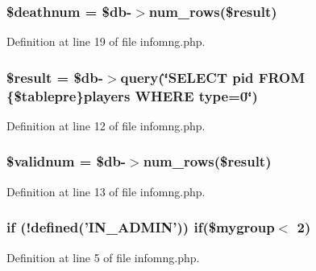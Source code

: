 \hypertarget{infomng_8php_ac8cccc0e21ebd6828150700b1436a5f8}{
\subsubsection[{\$deathnum}]{\setlength{\rightskip}{0pt plus 5cm}\$deathnum = \$db-\/$>$num\+\_\+rows(\${\bf result})}}\label{infomng_8php_ac8cccc0e21ebd6828150700b1436a5f8}


Definition at line 19 of file infomng.\+php.

\hypertarget{infomng_8php_a112ef069ddc0454086e3d1e6d8d55d07}{
\subsubsection[{\$result}]{\setlength{\rightskip}{0pt plus 5cm}\${\bf result} = \$db-\/$>$query(\char`\"{}S\+E\+L\+E\+C\+T pid F\+R\+O\+M \{\$tablepre\}players W\+H\+E\+R\+E type=0\char`\"{})}}\label{infomng_8php_a112ef069ddc0454086e3d1e6d8d55d07}


Definition at line 12 of file infomng.\+php.

\hypertarget{infomng_8php_a54f1a166645794ce06e05051071a0d53}{
\subsubsection[{\$validnum}]{\setlength{\rightskip}{0pt plus 5cm}\$validnum = \$db-\/$>$num\+\_\+rows(\${\bf result})}}\label{infomng_8php_a54f1a166645794ce06e05051071a0d53}


Definition at line 13 of file infomng.\+php.

\hypertarget{infomng_8php_aa93bb0e22ba7aba2dc84d85bda19b4a4}{
\subsubsection[{if}]{\setlength{\rightskip}{0pt plus 5cm}if (!defined('{\bf I\+N\+\_\+\+A\+D\+M\+I\+N}')) if(\$mygroup$<$ 2)}}\label{infomng_8php_aa93bb0e22ba7aba2dc84d85bda19b4a4}


Definition at line 5 of file infomng.\+php.

